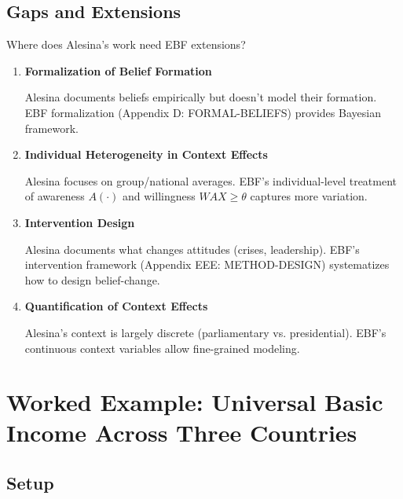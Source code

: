 \subsection{Gaps and Extensions}

Where does Alesina's work need EBF extensions?

\begin{enumerate}

\item \textbf{Formalization of Belief Formation}

   Alesina documents beliefs empirically but doesn't model their formation.
   EBF formalization (Appendix D: FORMAL-BELIEFS) provides Bayesian framework.

\item \textbf{Individual Heterogeneity in Context Effects}

   Alesina focuses on group/national averages. EBF's individual-level treatment of
   awareness $A(\cdot)$ and willingness $WAX \geq \theta$ captures more variation.

\item \textbf{Intervention Design}

   Alesina documents what changes attitudes (crises, leadership). EBF's intervention
   framework (Appendix EEE: METHOD-DESIGN) systematizes how to design belief-change.

\item \textbf{Quantification of Context Effects}

   Alesina's context is largely discrete (parliamentary vs. presidential). EBF's
   continuous context variables allow fine-grained modeling.

\end{enumerate}

\clearpage


\section{Worked Example: Universal Basic Income Across Three Countries}
\label{sec:alesina-example}

\subsection{Setup}

